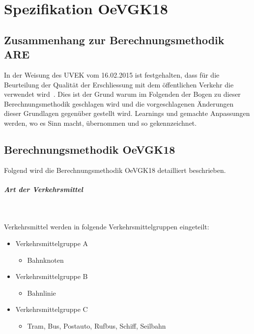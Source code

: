 
\section{Spezifikation OeVGK18}
\label{Spezifikation OeVGK18}

\subsection{Zusammenhang zur Berechnungsmethodik ARE}
\label{Spezifikation OeVGK18:Zusammenhang zur Berechnungsmethodik ARE}
In der Weisung des \acs{UVEK} vom 16.02.2015 ist festgehalten, dass für die Beurteilung der Qualität der Erschliessung mit dem öffentlichen Verkehr die  verwendet wird~\cite{weisung_uvek}.
Dies ist der Grund warum im Folgenden der Bogen zu dieser Berechnungsmethodik geschlagen wird und die vorgeschlagenen Änderungen dieser Grundlagen gegenüber gestellt wird.
Learnings und gemachte Anpassungen werden, wo es Sinn macht, übernommen und so gekennzeichnet. 

\subsection{Berechnungsmethodik OeVGK18}
\label{Berechnungsmethodik OeVGK18}
Folgend wird die Berechnungsmethodik \gls{OeVGK18} detailliert beschrieben.

\subparagraph{Art der Verkehrsmittel}~\\
\label{Berechnungsmethodik OeVGK18:Art der Verkehrsmittel}

Verkehrsmittel werden in folgende Verkehrsmittelgruppen eingeteilt:

\begin{itemize}[noitemsep]
    \item Verkehrsmittelgruppe A
    \begin{itemize}
        \item Bahnknoten
    \end{itemize}
    \item Verkehrsmittelgruppe B
    \begin{itemize}
        \item Bahnlinie
    \end{itemize}
    \item Verkehrsmittelgruppe C
    \begin{itemize}
        \item Tram, Bus, Postauto, Rufbus, Schiff, Seilbahn
    \end{itemize}
\end{itemize}

